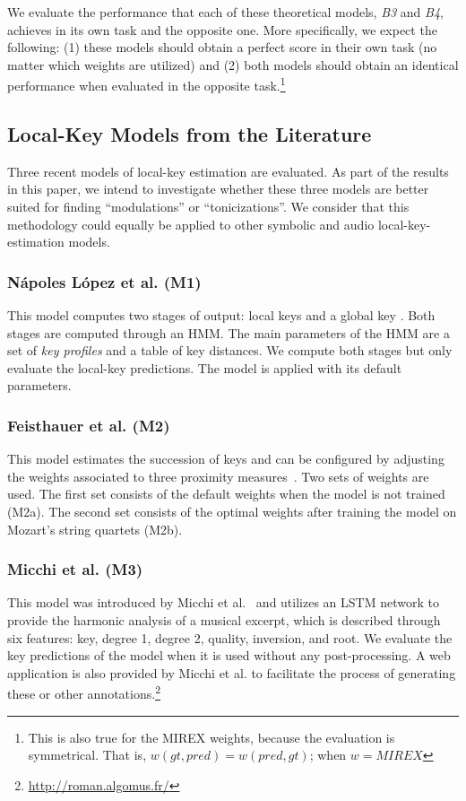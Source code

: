 \documentclass[sigconf]{acmart}
\begin{document}
We evaluate the performance that each of these theoretical models, \emph{B3} and \emph{B4}, achieves in its own task and the opposite one. More specifically, we expect the following: (1) these models should obtain a perfect score in their own task (no matter which weights are utilized) and (2) both models should obtain an identical performance when evaluated in the opposite task.\footnote{This is also true for the MIREX weights, because the evaluation is symmetrical. That is, $w(gt, pred) = w(pred, gt)$; when $w=MIREX$}

\subsection{Local-Key Models from the Literature}
Three recent models of local-key estimation are evaluated. 
As part of the results in this paper, we intend to investigate whether these three models are better suited for finding ``modulations'' or ``tonicizations''. 
We consider that this methodology could equally be applied to other symbolic and audio local-key-estimation models.

\subsubsection{N\'{a}poles L\'opez et al. (M1)}
This model computes two stages of output: local keys and a global key \cite{napoleslopez2019key}. Both stages are computed through an HMM. 
The main parameters of the HMM are a set of \emph{key profiles} and a table of key distances. 
We compute both stages but only evaluate the local-key predictions. 
The model is applied with its default parameters.

\subsubsection{Feisthauer et al. (M2)}
This model estimates the succession of keys and can be configured by adjusting the weights associated to three proximity measures~\cite{feisthauer2020smc}. 
Two sets of weights are used. 
The first set consists of the default weights when the model is not trained (M2a).
The second set consists of the optimal weights after training the model on Mozart's string quartets (M2b). 

\subsubsection{Micchi et al. (M3)}
This model was introduced by Micchi et al.~\cite{Micchi20:roman} and utilizes an LSTM network to provide the harmonic analysis of a musical excerpt, which is described through six features: key, degree 1, degree 2, quality, inversion, and root. 
We evaluate the key predictions of the model when it is used without any post-processing. 
A web application is also provided by Micchi et al. to facilitate the process of generating these or other annotations.\footnote{ \url{http://roman.algomus.fr/}}
\end{document}
